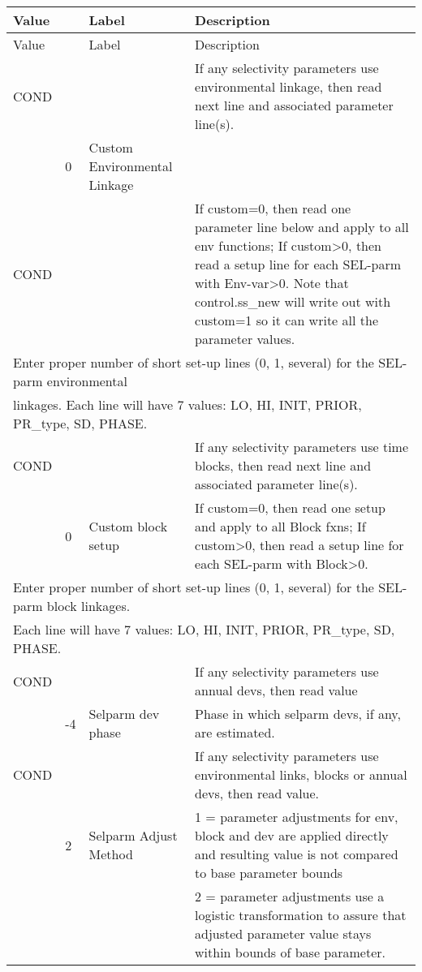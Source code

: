 \begin{center}
	\begin{longtable}{p{2cm} p{1cm} p{4cm} p{8cm}}
		Value & & Label & Description\\
		\hline
		\endfirsthead

		Value & & Label & Description\\
		\hline
		\endhead

		\endfoot

		\endlastfoot

			COND &  & & If any selectivity parameters use environmental linkage, then read next line and associated parameter line(s).\\
			     & 0 & Custom Environmental Linkage	& \\
			\hline
			COND &  & & If custom=0, then read one parameter line below and apply to all env functions;
			If custom>0, then read a setup line for each SEL-parm with Env-var>0. Note that control.ss\_new will write out with custom=1 so it can write all the parameter values.\\
			\hline
			\multicolumn{4}{l}{Enter proper number of short set-up lines (0, 1, several) for the SEL-parm environmental}\\
			\multicolumn{4}{l}{linkages.  Each line will have 7 values:  LO, HI, INIT, PRIOR, PR\_type, SD, PHASE.}\\
			\hline
			COND & & & If any selectivity parameters use time blocks, then read next line and associated parameter line(s). \\
			     & 0 & Custom block setup & If custom=0, then read one setup and apply to all Block fxns;
			     If custom>0, then read a setup line for each SEL-parm with Block>0.  \\
			\hline
			\multicolumn{4}{l}{Enter proper number of short set-up lines (0, 1, several) for the SEL-parm block linkages.}\\
			\multicolumn{4}{l}{Each line will have 7 values:  LO, HI, INIT, PRIOR, PR\_type, SD, PHASE.} \\
			\hline
			COND &  & & If any selectivity parameters use annual devs, then read  value\\
			     & -4 & Selparm dev phase & Phase in which selparm devs, if any, are estimated. \\
			\hline
			COND &  & & If any selectivity parameters use environmental links, blocks or annual devs, then read value.\\
			     & 2 & Selparm Adjust Method & 1 = parameter adjustments for env, block and dev are applied directly and resulting value is not compared to base parameter bounds\\
			     &   & & 2 = parameter adjustments use a logistic transformation to assure that adjusted parameter value stays within bounds of base parameter.\\
			\hline
	\end{longtable}
\end{center}

